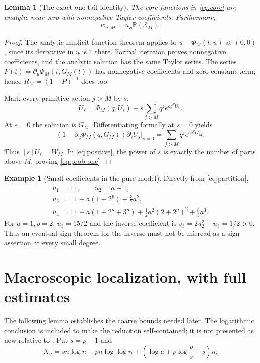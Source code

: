 \documentclass[11pt,a4paper]{article}
\numberwithin{equation}{section}
\newtheorem{lemma}[theorem]{Lemma}
\theoremstyle{definition}
\newtheorem{example}[theorem]{Example}
\theoremstyle{remark}
\newcommand{\Prob}{\mathbb P}\newcommand{\E}{\mathbb E}
\newcommand{\One}{\mathcal E_M}
\begin{document}
\begin{lemma}[The exact one-tail identity]
\label{lem:marking}
The core functions in \eqref{eq:core} are analytic near zero with
nonnegative Taylor coefficients. Furthermore,
\begin{equation}
 w_{n,M}=u_n\Prob(\One).
 \label{eq:prob-one}
\end{equation}
\end{lemma}

\begin{proof}
The analytic implicit function theorem applies to
$u-\Phi_M(t,u)$ at $(0,0)$, since its derivative in $u$ is $1$ there.
Formal iteration proves nonnegative coefficients, and the analytic
solution has the same Taylor series. The series
$P(t)=\partial_u\Phi_M(t,G_M(t))$ has nonnegative coefficients and zero
constant term; hence $R_M=(1-P)^{-1}$ does too.

Mark every primitive action $j>M$ by $s$:
\[
 U_s=\Phi_M(q,U_s)+s\sum_{j>M}q^je^{a j^pU_s}.
\]
At $s=0$ the solution is $G_M$. Differentiating formally at $s=0$ yields
\[
 (1-\partial_u\Phi_M(q,G_M))\left.\partial_sU_s\right|_{s=0}
 =\sum_{j>M}q^je^{a j^pG_M}.
\]
Thus $[s]U_s=W_M$. In \eqref{eq:positive}, the power of $s$ is exactly
the number of parts above $M$, proving \eqref{eq:prob-one}.
\end{proof}

\begin{example}[Small coefficients in the pure model]
Directly from \eqref{eq:partition},
\begin{align*}
 u_1&=1,\qquad u_2=a+1,\\
 u_3&=1+a(1+2^p)+\tfrac32a^2,\\
 u_4&=1+a(1+2^p+3^p)
       +\tfrac12a^2(2+2^p)^2+\tfrac83a^3.
\end{align*}
For $a=1,p=2$, $u_3=15/2$ and the inverse coefficient is
$v_3=2u_2^2-u_3=1/2>0$. Thus an eventual-sign theorem for the inverse
must not be misread as a sign assertion at every small degree.
\end{example}

\section{Macroscopic localization, with full estimates}
\label{sec:macro}

The following lemma establishes the coarse bounds needed later. The
logarithmic conclusion is included to make the reduction self-contained;
it is not presented as new relative to \cite{feedback}.
Put $s=p-1$ and
\begin{equation}
 X_n=s n\log n-p n\log\log n
 +\left(\log a+p\log\frac p{s}-s\right)n.
 \label{eq:Xn}
\end{equation}
\end{document}
